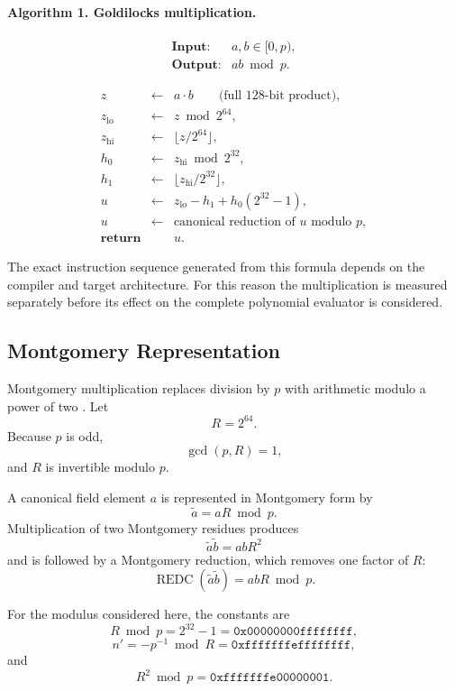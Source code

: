 \paragraph{Algorithm 1. Goldilocks multiplication.}

\[
\begin{array}{ll}
\textbf{Input:} & a,b\in[0,p),\\
\textbf{Output:} & ab\bmod p.
\end{array}
\]

\[
\begin{array}{rcl}
z &\leftarrow& a\cdot b \qquad\text{(full \(128\)-bit product)},\\
z_{\mathrm{lo}} &\leftarrow& z\bmod 2^{64},\\
z_{\mathrm{hi}} &\leftarrow& \lfloor z/2^{64}\rfloor,\\
h_0 &\leftarrow& z_{\mathrm{hi}}\bmod 2^{32},\\
h_1 &\leftarrow& \lfloor z_{\mathrm{hi}}/2^{32}\rfloor,\\
u &\leftarrow& z_{\mathrm{lo}}-h_1+h_0(2^{32}-1),\\
u &\leftarrow& \text{canonical reduction of }u\text{ modulo }p,\\
\textbf{return}&&u.
\end{array}
\]

The exact instruction sequence generated from this formula depends on the
compiler and target architecture.  For this reason the multiplication is
measured separately before its effect on the complete polynomial evaluator
is considered.

\subsection{Montgomery Representation}
\label{sec:montgomery}

Montgomery multiplication replaces division by \(p\) with arithmetic modulo
a power of two \cite{montgomery1985}.  Let
\[
R=2^{64}.
\]
Because \(p\) is odd,
\[
\gcd(p,R)=1,
\]
and \(R\) is invertible modulo \(p\).

A canonical field element \(a\) is represented in Montgomery form by
\[
\widetilde{a}=aR\bmod p.
\]
Multiplication of two Montgomery residues produces
\[
\widetilde{a}\widetilde{b}
=
abR^2
\]
and is followed by a Montgomery reduction, which removes one factor of
\(R\):
\[
\operatorname{REDC}
\left(
\widetilde{a}\widetilde{b}
\right)
=
abR\bmod p.
\]

For the modulus considered here, the constants are
\[
R\bmod p
=
2^{32}-1
=
\mathtt{0x00000000ffffffff},
\]
\[
n'=-p^{-1}\bmod R
=
\mathtt{0xfffffffeffffffff},
\]
and
\[
R^2\bmod p
=
\mathtt{0xfffffffe00000001}.
\]

